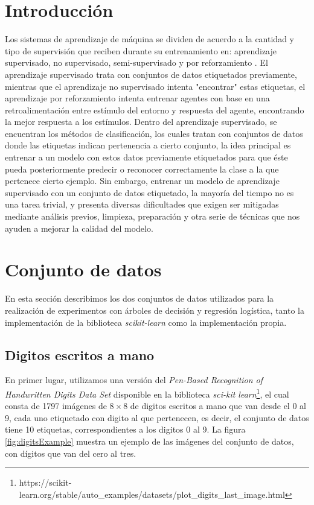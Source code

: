\documentclass[runningheads]{llncs}
\begin{document}
\section{Introducción}
Los sistemas de aprendizaje de máquina se dividen de acuerdo a la cantidad y tipo de supervisión que reciben durante su entrenamiento en: aprendizaje supervisado, no supervisado, semi-supervisado y por reforzamiento \cite{handsonML}. El aprendizaje supervisado trata con conjuntos de datos etiquetados previamente, mientras que el aprendizaje no supervisado intenta "encontrar" estas etiquetas, el aprendizaje por reforzamiento intenta entrenar agentes con base en una retroalimentación entre estímulo del entorno y respuesta del agente, encontrando la mejor respuesta a los estímulos. Dentro del aprendizaje supervisado, se encuentran los métodos de clasificación, los cuales tratan con conjuntos de datos donde las etiquetas indican pertenencia a cierto conjunto, la idea principal es entrenar a un modelo con estos datos previamente etiquetados para que éste pueda posteriormente predecir o reconocer correctamente la clase a la que pertenece cierto ejemplo. Sin embargo, entrenar un modelo de aprendizaje supervisado con un conjunto de datos etiquetado, la mayoría del tiempo no es una tarea trivial, y presenta diversas dificultades que exigen ser mitigadas mediante análisis previos, limpieza, preparación y otra serie de técnicas que nos ayuden a mejorar la calidad del modelo.

\section{Conjunto de datos}
En esta sección describimos los dos conjuntos de datos utilizados para la realización de experimentos con árboles de decisión y regresión logística, tanto la implementación de la biblioteca \textit{scikit-learn} como la implementación propia.

\subsection{Digitos escritos a mano}
En primer lugar, utilizamos una versión del \textit{Pen-Based Recognition of Handwritten Digits Data Set} \cite{Dua:2019} disponible en la biblioteca \textit{sci-kit learn}\footnote{https://scikit-learn.org/stable/auto\_examples/datasets/plot\_digits\_last\_image.html}, el cual consta de 1797 imágenes de $8 \times 8$ de digitos escritos a mano que van desde el 0 al 9, cada uno etiquetado con digito al que pertenecen, es decir, el conjunto de datos tiene 10 etiquetas, correspondientes a los digitos 0 al 9. La figura \ref{fig:digitsExample} muestra un ejemplo de las imágenes del conjunto de datos, con dígitos que van del cero al tres.
\end{document}
